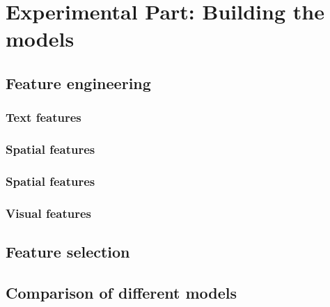 \chapter{Experimental Part: Building the models}
\section{Feature engineering}
\subsection{Text features}
\subsection{Spatial features}
\subsection{Spatial features}
\subsection{Visual features}
\section{Feature selection}
\section{Comparison of different models}
